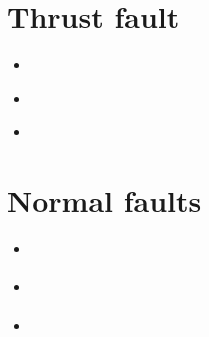 \section{Thrust fault} 

\begin{scriptsize}
\begin{itemize}
\item[\nineteenninety] 
\textcite{moen90b} \\  %
\item[\nineteenninetytwo] 
\textcite{moln92} \\
\item[\twothousandfourteen] 
\textcite{stsc14} \\
\end{itemize}
\end{scriptsize}


\section{Normal faults} 


\begin{scriptsize}
\begin{itemize}
\item[\twothousand]
\textcite{heha05} 
\item[\twothousand]
\textcite{maha08} 
\item[\twothousand]
\textcite{hahe15} 
\end{itemize}
\end{scriptsize}


